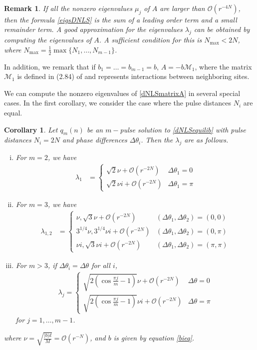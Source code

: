 \documentclass[12pt]{article}
\newtheorem{corollary}{Corollary}
\newtheorem{remark}{Remark}
\begin{document}
\begin{remark}
If all the nonzero eigenvalues $\mu_j$ of $A$ are larger than $\mathcal{O}(r^{-4N})$, then the formula \eqref{eigsDNLS} is the sum of a leading order term and a small remainder term. A good approximation for the eigenvalues $\lambda_j$ can be obtained by computing the eigenvalues of $A$. A sufficient condition for this is $N_{\mathrm{max}} < 2 N$, where $N_{\mathrm{max}} = \frac{1}{2} \max\{ N_1, \dots, N_{m-1}\}$.
\end{remark}

\noindent In addition, we remark that if $b_1 = \dots = b_{m-1} = b$, $A = -b \mathcal{M}_1$, where the matrix $\mathcal{M}_1$ is defined in (2.84) of \cite{Kevrekidis2009} and represents interactions between neighboring sites.

We can compute the nonzero eigenvalues of \eqref{dNLSmatrixA} in several special cases. In the first corollary, we consider the case where the pulse distances $N_i$ are equal.

\begin{corollary}\label{dNLSeigcorr}Let $q_m(n)$ be an $m-$pulse solution to \eqref{dNLSequilib} with pulse distances $N_i = 2N$ and phase differences $\Delta\theta_i$. Then the $\lambda_j$ are as follows.
\begin{enumerate}[(i)]
\item For $m = 2$, we have
\begin{align}\label{2pulseeigs}
\lambda_1 &= 
\begin{cases}
\sqrt{2}\nu  + \mathcal{O}(r^{-2N}) & \Delta\theta_1 = 0 \\
\sqrt{2}\nu i + \mathcal{O}(r^{-2N}) & \Delta\theta_1 = \pi
\end{cases}
\end{align}
\item For $m = 3$, we have
\begin{align}\label{3pulseequaleigs}
\lambda_{1, 2} &= \begin{cases}
\nu, \sqrt{3} \nu + \mathcal{O}(r^{-2N}) & (\Delta\theta_1, \Delta\theta_2) = (0, 0) \\
3^{1/4}\nu, 3^{1/4}\nu i + \mathcal{O}(r^{-2N}) & (\Delta\theta_1, \Delta\theta_2) = (0, \pi) \\
\nu i, \sqrt{3} \nu i + \mathcal{O}(r^{-2N}) & (\Delta\theta_1, \Delta\theta_2) = (\pi, \pi)
\end{cases}
\end{align}
\item For $m > 3$, if $\Delta\theta_i = \Delta\theta$ for all $i$,
\begin{align*}
\lambda_j = \begin{cases}
\sqrt{2\left( \cos\frac{\pi j}{m} - 1 \right)}\nu + \mathcal{O}(r^{-2N}) & \Delta\theta = 0 \\
\sqrt{2\left( \cos\frac{\pi j}{m} - 1 \right)}\nu i + \mathcal{O}(r^{-2N}) & \Delta\theta = \pi
\end{cases}
\end{align*}
for $j = 1, \dots, m-1$.
\end{enumerate}
where $\nu = \sqrt{\frac{|b|d}{M}} = \mathcal{O}(r^{-N})$, and $b$ is given by equation \eqref{bieq}.
\end{corollary}
\end{document}
